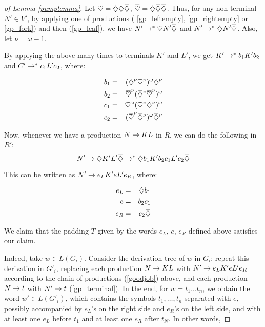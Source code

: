 \documentclass{article}
\begin{document}
\begin{proof}[of Lemma \ref{pumplemma}]

\def\ob{\heartsuit}
\def\cb{{\overbar{\heartsuit}}}
Let $\ob = \oa \oa \ca$, $\cb = \oa \ca \ca$. Thus, for any 
non-terminal $N' \in V'$, by applying one of productions (
\ref{gp_leftempty}, \ref{gp_rightempty} or \ref{gp_fork}) and then 
(\ref{gp_leaf}), we have $N' \ra^* \ob N' \ca$ and 
$N' \ra^* \oa N' \cb$. Also, let $\nu = \omega-1$.

By applying the above many times to terminals $K'$ and $L'$, we get
$K' \rightarrow^* b_1 K' b_2$ and $C' \rightarrow^* c_1 L' c_2$, where:

\begin{eqnarray}
b_1 &=& (\oa^\nu \ob^\nu)^\omega \oa^\nu \\
b_2 &=& \cb^\nu (\ca^\nu \cb^\nu)^\omega \\
c_1 &=& \ob^\omega (\ob^\nu \oa^\nu)^\omega \\
c_2 &=& (\cb^\nu \ca^\nu)^\omega \ca^\nu
\end{eqnarray}

Now, whenever we have a production $N \rightarrow KL$ in $R$, we can do the following in $R'$:
\begin{equation} \label{goodjob}
N' \ra \oa K'L' \ca \ra^* \oa b_1 K' b_2 c_1 L' c_2 \ca
\end{equation}

This can be written as $N' \rightarrow e_L K' e L' e_R$, where:

\begin{eqnarray}
e_L &=& \oa b_1 \\
e   &=& b_2 c_1 \\
e_R &=& c_2 \ca
\end{eqnarray}

We claim that the padding $T$ given by the words $e_L$, $e$, $e_R$ defined above
satisfies our claim.

Indeed, take $w \in L(G_i)$. Consider the derivation tree of $w$ in $G_i$;
repeat this derivation in $G'_i$, replacing each production $N \rightarrow KL$ with
$N' \rightarrow e_L K' e L' e_R$ according to
the chain of productions (\ref{goodjob}) above, and each production $N \rightarrow t$ with $N' \rightarrow t$
(\ref{gp_terminal}).
In the end, for $w = t_1 \ldots t_n$, we obtain the word $w' \in L(G'_i)$, which
contains the symbols $t_1, \ldots, t_n$ separated with $e$, possibly accompanied
by $e_L$'s on the right side and $e_R$'s on the left side, and with at least one
$e_L$ before $t_1$ and at least one $e_R$ after $t_N$. In other words,


\end{proof}
\end{document}
